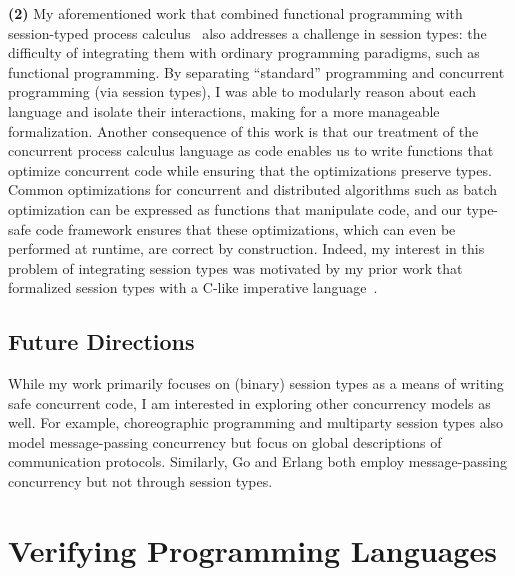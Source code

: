 \documentclass[11pt]{article}
\begin{document}
\textbf{(2)} My aforementioned work that combined functional programming with session-typed process calculus~\cite{Sano25icfp} also addresses a challenge in session types: the difficulty of integrating them with ordinary programming paradigms, such as functional programming.
By separating ``standard'' programming and concurrent programming (via session types), I was able to modularly reason about each language and isolate their interactions, making for a more manageable formalization.
Another consequence of this work is that our treatment of the concurrent process calculus language as code enables us to write functions that optimize concurrent code while ensuring that the optimizations preserve types.
Common optimizations for concurrent and distributed algorithms such as batch optimization can be expressed as functions that manipulate code, and our type-safe code framework ensures that these optimizations, which can even be performed at runtime, are correct by construction.
Indeed, my interest in this problem of integrating session types was motivated by my prior work that formalized session types with a C-like imperative language~\cite{Sano19ms}.

\subsection*{Future Directions}
While my work primarily focuses on (binary) session types as a means of writing safe concurrent code, I am interested in exploring other concurrency models as well.
For example, choreographic programming and multiparty session types also model message-passing concurrency but focus on global descriptions of communication protocols.
Similarly, Go and Erlang both employ message-passing concurrency but not through session types.

\section*{Verifying Programming Languages}
\end{document}
